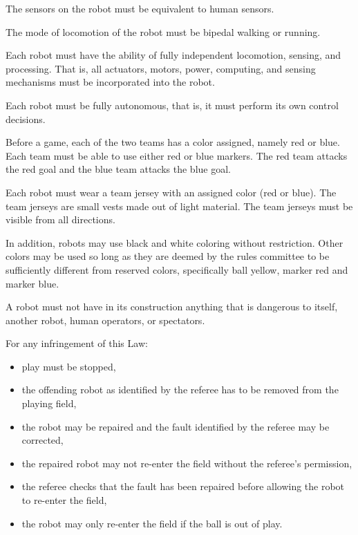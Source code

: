 \documentclass[12pt]{hurocup}
\begin{document}
\begin{lawlist}[G]
\item \label{sensing} The sensors on the robot must be equivalent to
human sensors.

\item \label{walking} The mode of locomotion of the robot must be
bipedal walking or running. 

\item \label{autonomous} Each robot must have the ability of fully
  independent locomotion, sensing, and processing. That is, all
  actuators, motors, power, computing, and sensing mechanisms must be
  incorporated into the robot.

\item \label{autonomous2} Each robot must be fully autonomous, that
  is, it must perform its own control decisions.

\item Before a game, each of the two teams has a color assigned,
  namely red or blue. Each team must be able to use either red
  or blue markers. The red team attacks the red goal and the
  blue team attacks the blue goal. 

\item Each robot must wear a team jersey with an assigned color (red
  or blue). The team jerseys are small vests made out of light
  material. The team jerseys must be visible from all directions.

\item In addition, robots may use black and white coloring without
  restriction. Other colors may be used so long as they are deemed by
  the rules committee to be sufficiently different from reserved
  colors, specifically ball yellow, marker red and
  marker blue.

\item A robot must not have in its construction anything that is
  dangerous to itself, another robot, human operators, or spectators.

\item For any infringement of this Law:
  \begin{itemize}
  \item play must be stopped,
  \item the offending robot as identified by the referee has to be
    removed from the playing field,
  \item the robot may be repaired and the fault identified by the
    referee may be corrected,
  \item the repaired robot may not re-enter the field without the
    referee's permission,
  \item the referee checks that the fault has been repaired before
    allowing the robot to re-enter the field,
  \item the robot may only re-enter the field if the ball is out of
    play. 
  \end{itemize}
\end{lawlist}
\end{document}
